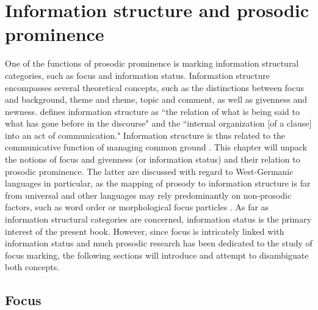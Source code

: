 \section{Information structure and prosodic prominence} \label{section: Information structure}

One of the functions of prosodic prominence is marking information structural categories, such as focus and information status. Information structure encompasses several theoretical concepts, such as the distinctions between focus and background, theme and rheme, topic and comment, as well as givenness and newness. \citet[199]{hallidayNotesTransitivityTheme1967} defines information structure as ``the relation of what is being said to what has gone before in the discourse" and the ``internal organization [of a clause] into an act of communication." Information structure is thus related to the communicative function of managing common ground \citep[e.g.,][]{krifkaBasicNotionsInformation2008}. This chapter will unpack the notions of focus and givenness (or information status) and their relation to prosodic prominence. The latter are discussed with regard to West-Germanic languages in particular, as the mapping of prosody to information structure is far from universal and other languages may rely predominantly on non-prosodic factors, such as word order or morphological focus particles \citep[e.g.,][]{buringTypologyFocusRealization2009}. As far as information structural categories are concerned, information status is the primary interest of the present book. However, since focus is intricately linked with information status and much prosodic research has been dedicated to the study of focus marking, the following sections will introduce and attempt to disambiguate both concepts. 

\subsection{Focus} \label{sec: focus background}

